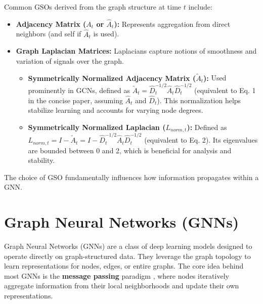 Common GSOs derived from the graph structure at time $t$ include:
\begin{itemize}
    \item \textbf{Adjacency Matrix ($A_t$ or $\hat{A}_t$):} Represents aggregation from direct neighbors (and self if $\hat{A}_t$ is used).
    \item \textbf{Graph Laplacian Matrices:} Laplacians capture notions of smoothness and variation of signals over the graph.
        \begin{itemize}
        
            \item \textbf{Symmetrically Normalized Adjacency Matrix ($\tilde{A}_t$):} Used prominently in GCNs, defined as $\tilde{A}_t = \hat{D}_t^{-1/2} \hat{A}_t \hat{D}_t^{-1/2}$ (equivalent to Eq. 1 in the concise paper, assuming $\hat{A}_t$ and $\hat{D}_t$). This normalization helps stabilize learning and accounts for varying node degrees.
            \item \textbf{Symmetrically Normalized Laplacian ($L_{norm, t}$):} Defined as $L_{norm, t} = I - \tilde{A}_t = I - \hat{D}_t^{-1/2} \hat{A}_t \hat{D}_t^{-1/2}$ (equivalent to Eq. 2). Its eigenvalues are bounded between 0 and 2, which is beneficial for analysis and stability.
        \end{itemize}
\end{itemize}
The choice of GSO fundamentally influences how information propagates within a GNN.

\section{Graph Neural Networks (GNNs)}
\label{sec:gnns}

Graph Neural Networks (GNNs) are a class of deep learning models designed to operate directly on graph-structured data. They leverage the graph topology to learn representations for nodes, edges, or entire graphs. The core idea behind most GNNs is the \textbf{message passing} paradigm \cite{Gilmer2017MessagePassing}, where nodes iteratively aggregate information from their local neighborhoods and update their own representations.

